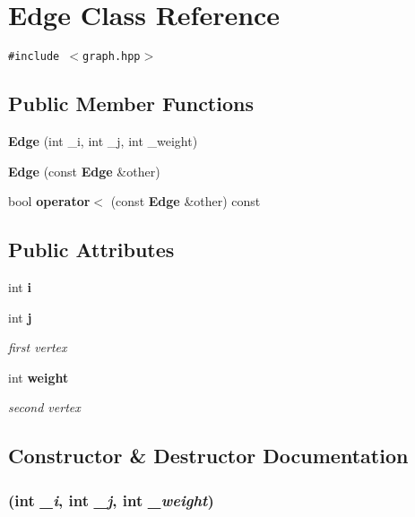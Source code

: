 \section{Edge Class Reference}
\label{classEdge}
{\tt \#include $<$graph.hpp$>$}

\subsection*{Public Member Functions}
\begin{CompactItemize}
\item 
{\bf Edge} (int \_\-i, int \_\-j, int \_\-weight)
\item 
{\bf Edge} (const {\bf Edge} \&other)
\item 
bool {\bf operator$<$} (const {\bf Edge} \&other) const 
\end{CompactItemize}
\subsection*{Public Attributes}
\begin{CompactItemize}
\item 
int {\bf i}
\item 
int {\bf j}
\begin{CompactList}\small\item\em first vertex \item\end{CompactList}\item 
int {\bf weight}
\begin{CompactList}\small\item\em second vertex \item\end{CompactList}\end{CompactItemize}


\subsection{Constructor \& Destructor Documentation}
\subsubsection{ (int {\em \_\-i}, int {\em \_\-j}, int {\em \_\-weight})\hspace{0.3cm}{\tt  [inline]}}\label{classEdge_a0}


